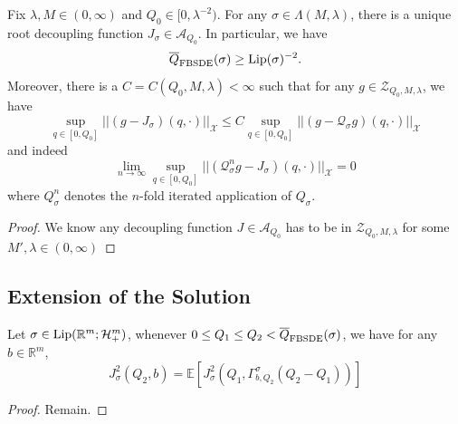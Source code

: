 \begin{proposition}
    Fix $\lambda, M \in (0,\infty)$ and $Q_0 \in [0,\lambda^{-2})$. For any $\sigma \in \Lambda(M,\lambda)$, there is a unique root decoupling function $J_{\sigma} \in \mathcal{A}_{Q_0}$. In particular, we have
    \[
    \overline{Q}_{\text{FBSDE}}(\sigma) \geq \text{Lip}(\sigma)^{-2}.
    \]
    Moreover, there is a $C = C(Q_0,M,\lambda) < \infty$ such that for any $g\in\mathcal{Z}_{Q_0,M,\lambda}$, we have
    \[
    \sup_{q\in[0,Q_0]}||(g-J_{\sigma})(q,\cdot)||_{\mathcal{X}} \leq C\sup_{q\in[0,Q_0]}||(g-\mathcal{Q}_{\sigma}g)(q,\cdot)||_{\mathcal{X}}
    \]
    and indeed
    \[
    \lim_{n\to\infty} \sup_{q\in[0,Q_0]}||(\mathcal{Q}_{\sigma}^n g - J_{\sigma})(q,\cdot)||_{\mathcal{X}} = 0
    \]
    where $Q^n_{\sigma}$ denotes the $n$-fold iterated application of $Q_{\sigma}$.
\end{proposition}
\begin{proof}
    We know any decoupling function $J\in\mathcal{A}_{Q_0}$ has to be in $\mathcal{Z}_{Q_0,M,\lambda}$ for some $M' ,\lambda \in (0,\infty)$
\end{proof}

\subsection{Extension of the Solution}

\begin{lemma}
    Let $\sigma \in \text{Lip}(\mathbb{R}^m;\mathcal{H}^m_+)$, whenever $0\leq Q_1\leq Q_2 < \overline{Q}_{\text{FBSDE}}(\sigma)$, we have for any $b\in\mathbb{R}^m$,
    \[
    J_{\sigma}^2(Q_2,b) = \mathbb{E}[J_{\sigma}^2(Q_1,\Gamma^{\sigma}_{b,Q_2}(Q_2-Q_1))]
    \]
    \label{dptower}
\end{lemma}
\begin{proof}
    Remain.
\end{proof}


